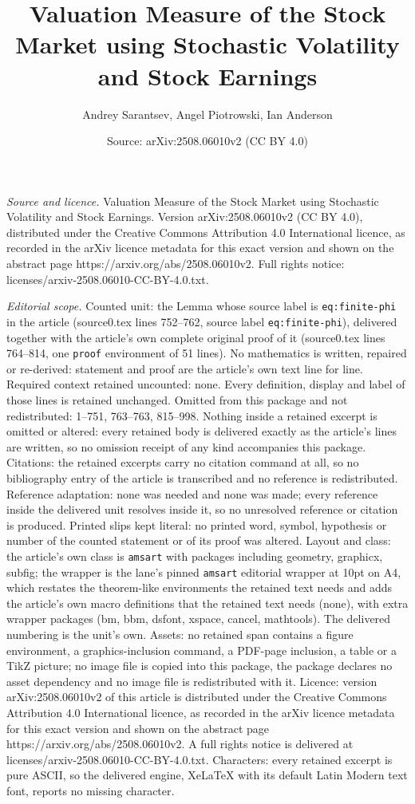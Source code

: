 \documentclass[10pt,a4paper]{amsart}
\title[Valuation Measure of the Stock Market using Stochastic Volat]{Valuation Measure of the Stock Market using Stochastic Volatility and Stock Earnings}
\author{Andrey Sarantsev, Angel Piotrowski, Ian Anderson}
\date{Source: arXiv:2508.06010v2 (CC BY 4.0)}
\begin{document}
\maketitle

\noindent\emph{Source and licence.} Valuation Measure of the Stock Market using Stochastic Volatility and Stock Earnings. Version arXiv:2508.06010v2 (CC BY 4.0), distributed under the Creative Commons Attribution 4.0 International licence, as recorded in the arXiv licence metadata for this exact version and shown on the abstract page https://arxiv.org/abs/2508.06010v2. Full rights notice: licenses/arxiv-2508.06010-CC-BY-4.0.txt.\par\smallskip

\noindent\textit{Editorial scope.} Counted unit: the Lemma whose source label is \texttt{eq:finite-phi} in the article (source0.tex lines 752--762, source label \texttt{eq:finite-phi}), delivered together with the article's own complete original proof of it (source0.tex lines 764--814, one \texttt{proof} environment of 51 lines). No mathematics is written, repaired or re-derived: statement and proof are the article's own text line for line. Required context retained uncounted: none. Every definition, display and label of those lines is retained unchanged. Omitted from this package and not redistributed: 1--751, 763--763, 815--998. Nothing inside a retained excerpt is omitted or altered: every retained body is delivered exactly as the article's lines are written, so no omission receipt of any kind accompanies this package. Citations: the retained excerpts carry no citation command at all, so no bibliography entry of the article is transcribed and no reference is redistributed. Reference adaptation: none was needed and none was made; every reference inside the delivered unit resolves inside it, so no unresolved reference or citation is produced. Printed slips kept literal: no printed word, symbol, hypothesis or number of the counted statement or of its proof was altered. Layout and class: the article's own class is \texttt{amsart} with packages including geometry, graphicx, subfig; the wrapper is the lane's pinned \texttt{amsart} editorial wrapper at 10pt on A4, which restates the theorem-like environments the retained text needs and adds the article's own macro definitions that the retained text needs (none), with extra wrapper packages (bm, bbm, dsfont, xspace, cancel, mathtools). The delivered numbering is the unit's own. Assets: no retained span contains a figure environment, a graphics-inclusion command, a PDF-page inclusion, a table or a TikZ picture; no image file is copied into this package, the package declares no asset dependency and no image file is redistributed with it. Licence: version arXiv:2508.06010v2 of this article is distributed under the Creative Commons Attribution 4.0 International licence, as recorded in the arXiv licence metadata for this exact version and shown on the abstract page https://arxiv.org/abs/2508.06010v2. A full rights notice is delivered at licenses/arxiv-2508.06010-CC-BY-4.0.txt. Characters: every retained excerpt is pure ASCII, so the delivered engine, XeLaTeX with its default Latin Modern text font, reports no missing character.
\end{document}
